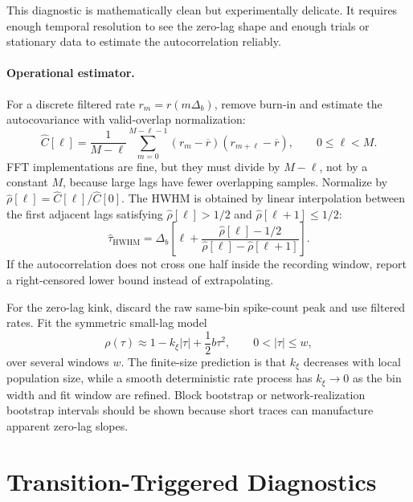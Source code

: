 This diagnostic is mathematically clean but experimentally delicate. It requires
enough temporal resolution to see the zero-lag shape and enough trials or
stationary data to estimate the autocorrelation reliably.

\paragraph{Operational estimator.}
For a discrete filtered rate \(r_m=r(m\Delta_b)\), remove burn-in and estimate
the autocovariance with valid-overlap normalization:
\begin{equation}
    \widehat C[\ell]
    =
    \frac{1}{M-\ell}
    \sum_{m=0}^{M-\ell-1}
    (r_m-\overline r)(r_{m+\ell}-\overline r),
    \qquad
    0\le \ell<M .
    \label{eq:ch09-discrete-autocovariance}
\end{equation}
FFT implementations are fine, but they must divide by \(M-\ell\), not by a
constant \(M\), because large lags have fewer overlapping samples. Normalize by
\(\widehat\rho[\ell]=\widehat C[\ell]/\widehat C[0]\). The HWHM is obtained by
linear interpolation between the first adjacent lags satisfying
\(\widehat\rho[\ell]>1/2\) and \(\widehat\rho[\ell+1]\le 1/2\):
\begin{equation}
    \widehat\tau_{\mathrm{HWHM}}
    =
    \Delta_b
    \left[
        \ell
        +
        \frac{\widehat\rho[\ell]-1/2}
        {\widehat\rho[\ell]-\widehat\rho[\ell+1]}
    \right].
    \label{eq:ch09-hwhm-interpolation}
\end{equation}
If the autocorrelation does not cross one half inside the recording window,
report a right-censored lower bound instead of extrapolating.

For the zero-lag kink, discard the raw same-bin spike-count peak and use
filtered rates. Fit the symmetric small-lag model
\begin{equation}
    \rho(\tau)
    \approx
    1-k_{\xi}|\tau|
    +
    \frac{1}{2}b\tau^2,
    \qquad 0<|\tau|\le w ,
    \label{eq:ch09-kink-fit}
\end{equation}
over several windows \(w\). The finite-size prediction is that \(k_\xi\)
decreases with local population size, while a smooth deterministic rate process
has \(k_\xi\to 0\) as the bin width and fit window are refined. Block bootstrap
or network-realization bootstrap intervals should be shown because short traces
can manufacture apparent zero-lag slopes.

\section{Transition-Triggered Diagnostics}
\label{sec:ch09-transition-triggered}

